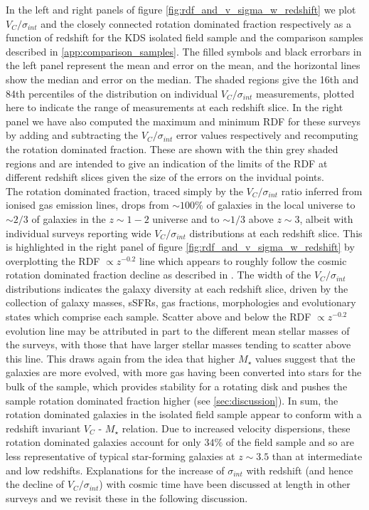 \documentclass[fleqn,usenatbib]{mn2e}
\begin{document}
In the left and right panels of figure \ref{fig:rdf_and_v_sigma_w_redshift} we plot $V_{C}/\sigma_{int}$ and the closely connected rotation dominated fraction respectively as a function of redshift for the KDS isolated field sample and the comparison samples described in \cref{app:comparison_samples}.
The filled symbols and black errorbars in the left panel represent the mean and error on the mean, and the horizontal lines show the median and error on the median.
The shaded regions give the 16th and 84th percentiles of the distribution on individual $V_{C}/\sigma_{int}$ measurements, plotted here to indicate the range of measurements at each redshift slice.
In the right panel we have also computed the maximum and minimum RDF for these surveys by adding and subtracting the $V_{C}/\sigma_{int}$ error values respectively and recomputing the rotation dominated fraction.
These are shown with the thin grey shaded regions and are intended to give an indication of the limits of the RDF at different redshift slices given the size of the errors on the invidual points.\\

The rotation dominated fraction, traced simply by the $V_{C}/\sigma_{int}$ ratio inferred from ionised gas emission lines, drops from $\sim 100\%$ of galaxies in the local universe to $\sim 2/3$ of galaxies in the $z \sim 1-2$ universe and to $\sim 1/3$ above $z \sim 3$, albeit with individual surveys reporting wide $V_{C}/\sigma_{int}$ distributions at each redshift slice.
This is highlighted in the right panel of figure \ref{fig:rdf_and_v_sigma_w_redshift} by overplotting the RDF $\propto z^{-0.2}$ line which appears to roughly follow the cosmic rotation dominated fraction decline as described in \cite{Stott2016}. 
The width of the $V_{C}/\sigma_{int}$ distributions indicates the galaxy diversity at each redshift slice, driven by the collection of galaxy masses, sSFRs, gas fractions, morphologies and evolutionary states which comprise each sample.
Scatter above and below the RDF $\propto z^{-0.2}$ evolution line may be attributed in part to the different mean stellar masses of the surveys, with those that have larger stellar masses tending to scatter above this line.
This draws again from the idea that higher $M_{\star}$ values suggest that the galaxies are more evolved, with more gas having been converted into stars for the bulk of the sample, which provides stability for a rotating disk and pushes the sample rotation dominated fraction higher (see \cref{sec:discussion}).
In sum, the rotation dominated galaxies in the isolated field sample appear to conform with a redshift invariant $V_{C}$ - $M_{\star}$ relation.
Due to increased velocity dispersions, these rotation dominated galaxies account for only $34\%$ of the field sample and so are less representative of typical star-forming galaxies at $z\sim3.5$ than at intermediate and low redshifts. 
Explanations for the increase of $\sigma_{int}$ with redshift (and hence the decline of $V_{C}/\sigma_{int}$) with cosmic time have been discussed at length in other surveys \citep[e.g][]{ForsterSchreiber2009,Law2009,Wisnioski2015} and we revisit these in the following discussion.
\end{document}
